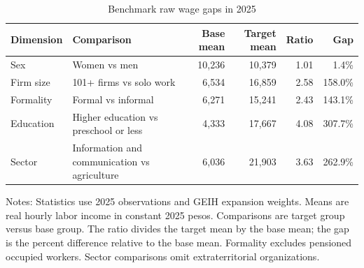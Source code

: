 \begin{table}[htbp]
  \centering
  \caption{Benchmark raw wage gaps in 2025}
  \label{tab:descriptive-benchmark-wage-gaps-2025}
  \small
  \begin{tabular}{lp{}rrrr}
    \toprule
    Dimension & Comparison & Base mean & Target mean & Ratio & Gap \\
    \midrule
    Sex & Women vs men & 10,236 & 10,379 & 1.01 & 1.4\% \\
    Firm size & 101+ firms vs solo work & 6,534 & 16,859 & 2.58 & 158.0\% \\
    Formality & Formal vs informal & 6,271 & 15,241 & 2.43 & 143.1\% \\
    Education & Higher education vs preschool or less & 4,333 & 17,667 & 4.08 & 307.7\% \\
    Sector & Information and communication vs agriculture & 6,036 & 21,903 & 3.63 & 262.9\% \\
    \bottomrule
  \end{tabular}
  \vspace{0.3em}
  \begin{minipage}{0.95\textwidth}
  \footnotesize
  Notes: Statistics use 2025 observations and GEIH expansion weights. Means are real hourly labor income in constant 2025 pesos. Comparisons are target group versus base group. The ratio divides the target mean by the base mean; the gap is the percent difference relative to the base mean. Formality excludes pensioned occupied workers. Sector comparisons omit extraterritorial organizations.
  \end{minipage}
\end{table}
